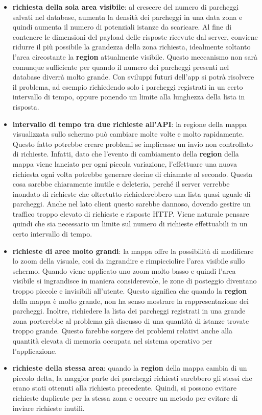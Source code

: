 \begin{itemize}
    \item \textbf{richiesta della sola area visibile}: al crescere del numero di parcheggi 
    salvati nel database, aumenta la densità dei parcheggi in una data zona e quindi 
    aumenta il numero di potenziali istanze da scaricare. Al fine di contenere le 
    dimensioni del payload delle risposte ricevute dal server, conviene ridurre il più
    possibile la grandezza della zona richiesta, idealmente soltanto l'area circostante
    la \textbf{region} attualmente visibile. Questo meccanismo non sarà comunque 
    sufficiente per quando il numero dei parcheggi presenti nel database diverrà
    molto grande. Con sviluppi futuri dell'app si potrà risolvere il problema, ad 
    esempio richiedendo solo i parcheggi registrati in un certo intervallo di tempo,
    oppure ponendo un limite alla lunghezza della lista in risposta.
    \item \textbf{intervallo di tempo tra due richieste all'API}: la regione della mappa
    visualizzata sullo schermo può cambiare molte volte e molto rapidamente. Questo fatto
    potrebbe creare problemi se implicasse un invio non controllato di richieste. Infatti,
    dato che l'evento di cambiamento della \textbf{region} della mappa viene lanciato per 
    ogni piccola variazione, l'effettuare una nuova richiesta ogni volta potrebbe 
    generare decine di chiamate al secondo. Questa cosa sarebbe chiaramente inutile e 
    deleteria, perché il server verrebbe inondato di richieste che oltretutto 
    richiederebbero una lista quasi uguale di parcheggi. Anche nel lato client questo 
    sarebbe dannoso, dovendo gestire un traffico troppo elevato di richieste e risposte
    HTTP. Viene naturale pensare quindi che sia necessario un limite sul numero di 
    richieste effettuabili in un certo intervallo di tempo.
    \item \textbf{richieste di aree molto grandi}: la mappa offre la possibilità di 
    modificare lo zoom della visuale, così da ingrandire e rimpicciolire l'area 
    visibile sullo schermo. Quando viene applicato uno zoom molto basso e quindi 
    l'area visibile si ingrandisce in maniera considerevole, le zone di posteggio
    diventano troppo piccole e invisibili all'utente. Questo significa che quando
    la \textbf{region} della mappa è molto grande, non ha senso mostrare la 
    rappresentazione dei parcheggi. Inoltre, richiedere la lista dei parcheggi
    registrati in una grande zona porterebbe al problema già discusso di una
    quantità di istanze trovate troppo grande. Questo farebbe sorgere dei 
    problemi relativi anche alla quantità elevata di memoria occupata nel
    sistema operativo per l'applicazione.
    \item \textbf{richieste della stessa area}: quando la \textbf{region} della mappa
    cambia di un piccolo delta, la maggior parte dei parcheggi richiesti sarebbero
    gli stessi che erano stati ottenuti alla richiesta precedente. Quindi, si possono
    evitare richieste duplicate per la stessa zona e occorre un metodo per evitare 
    di inviare richieste inutili.
\end{itemize}


